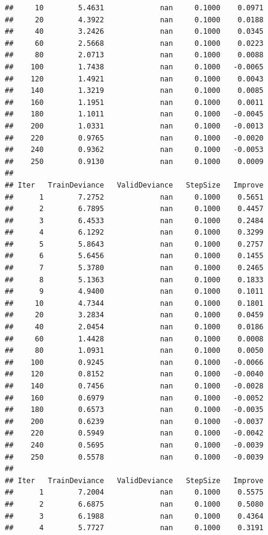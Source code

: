 \documentclass[]{book}
\begin{document}
\begin{verbatim}
##     10        5.4631             nan     0.1000    0.0971
##     20        4.3922             nan     0.1000    0.0188
##     40        3.2426             nan     0.1000    0.0345
##     60        2.5668             nan     0.1000    0.0223
##     80        2.0713             nan     0.1000    0.0088
##    100        1.7438             nan     0.1000   -0.0065
##    120        1.4921             nan     0.1000    0.0043
##    140        1.3219             nan     0.1000    0.0085
##    160        1.1951             nan     0.1000    0.0011
##    180        1.1011             nan     0.1000   -0.0045
##    200        1.0331             nan     0.1000   -0.0013
##    220        0.9765             nan     0.1000   -0.0020
##    240        0.9362             nan     0.1000   -0.0053
##    250        0.9130             nan     0.1000    0.0009
## 
## Iter   TrainDeviance   ValidDeviance   StepSize   Improve
##      1        7.2752             nan     0.1000    0.5651
##      2        6.7895             nan     0.1000    0.4457
##      3        6.4533             nan     0.1000    0.2484
##      4        6.1292             nan     0.1000    0.3299
##      5        5.8643             nan     0.1000    0.2757
##      6        5.6456             nan     0.1000    0.1455
##      7        5.3780             nan     0.1000    0.2465
##      8        5.1363             nan     0.1000    0.1833
##      9        4.9400             nan     0.1000    0.1011
##     10        4.7344             nan     0.1000    0.1801
##     20        3.2834             nan     0.1000    0.0459
##     40        2.0454             nan     0.1000    0.0186
##     60        1.4428             nan     0.1000    0.0008
##     80        1.0931             nan     0.1000    0.0050
##    100        0.9245             nan     0.1000   -0.0066
##    120        0.8152             nan     0.1000   -0.0040
##    140        0.7456             nan     0.1000   -0.0028
##    160        0.6979             nan     0.1000   -0.0052
##    180        0.6573             nan     0.1000   -0.0035
##    200        0.6239             nan     0.1000   -0.0037
##    220        0.5949             nan     0.1000   -0.0042
##    240        0.5695             nan     0.1000   -0.0039
##    250        0.5578             nan     0.1000   -0.0039
## 
## Iter   TrainDeviance   ValidDeviance   StepSize   Improve
##      1        7.2004             nan     0.1000    0.5575
##      2        6.6875             nan     0.1000    0.5080
##      3        6.1988             nan     0.1000    0.4364
##      4        5.7727             nan     0.1000    0.3191

\end{verbatim}
\end{document}
